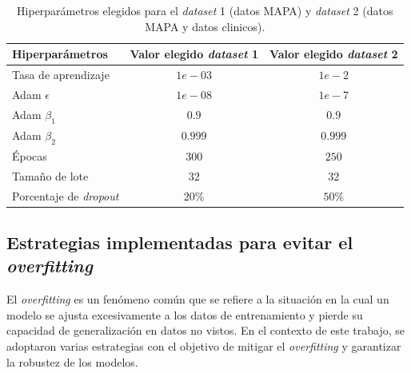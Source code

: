\begin{table}[H]
	\centering
	\caption{Hiperparámetros elegidos para el \emph{dataset} 1 (datos MAPA) y \emph{dataset} 2 (datos MAPA y datos clinicos).}
	\begin{tabular}{l c c}    
		\toprule
		\textbf{Hiperparámetros} 	      & \textbf{Valor elegido \emph{dataset} 1} 	& \textbf{Valor elegido \emph{dataset} 2}  \\
		\midrule
    Tasa de aprendizaje            & $1e-03$                   & $1e-2$\\		
    Adam $\epsilon$                   & $1e-08$                 & $1e-7$\\	
    Adam $\beta_1$                   & $0.9$                 & $0.9$\\	
    Adam $\beta_2$                   & $0.999$                 & $0.999$\\		
    Épocas                  & $300$                 & $250$\\	
    Tamaño de lote                  & $32$                 & $32$\\		
    Porcentaje de \emph{dropout}                 & $20\%$                 & $50\%$\\	

		\bottomrule
		\hline
	\end{tabular}
	\label{tab:Tabla1}
\end{table}


\subsection{Estrategias implementadas para evitar el \emph{overfitting}}
El \emph{overfitting} es un fenómeno común que se refiere a la situación en la cual un modelo 
se ajusta excesivamente a los datos de entrenamiento y pierde su capacidad de generalización 
en datos no vistos. En el contexto de este trabajo, se adoptaron varias estrategias 
con el objetivo de mitigar el \emph{overfitting} y garantizar la robustez de los modelos.

